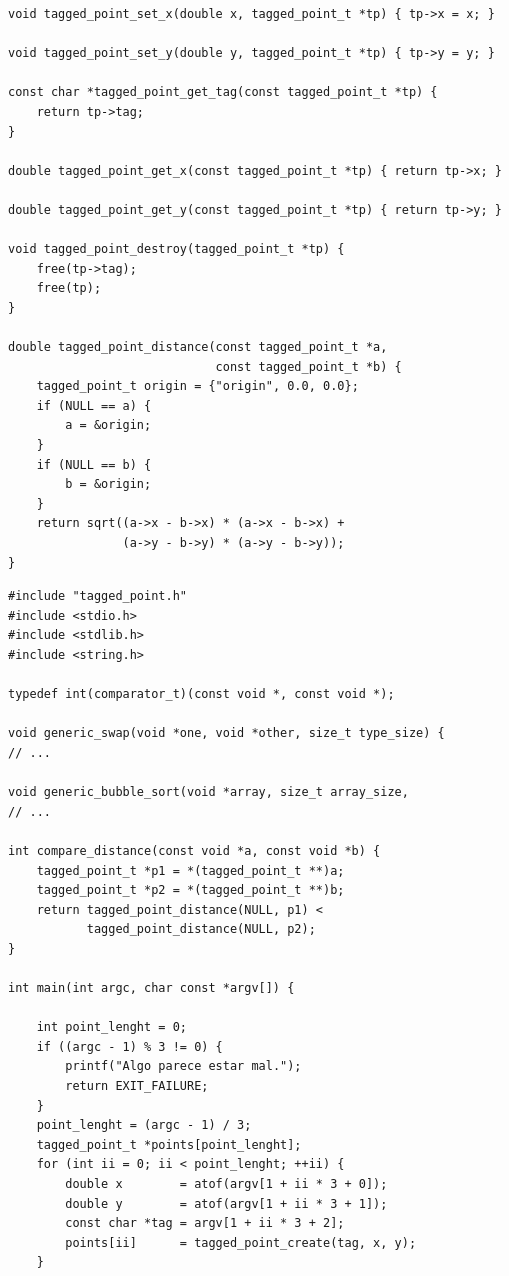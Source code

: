 \documentclass[a4paper]{article}
\begin{document}
\begin{exercises}
\begin{minipage}[H]{\linewidth}
\begin{lstlisting}[style=C,
caption={Solución al ejercicio 22 -- \texttt{tagged\_point.c}},
label={lst:solution22}]
void tagged_point_set_x(double x, tagged_point_t *tp) { tp->x = x; }

void tagged_point_set_y(double y, tagged_point_t *tp) { tp->y = y; }

const char *tagged_point_get_tag(const tagged_point_t *tp) {
    return tp->tag;
}

double tagged_point_get_x(const tagged_point_t *tp) { return tp->x; }

double tagged_point_get_y(const tagged_point_t *tp) { return tp->y; }

void tagged_point_destroy(tagged_point_t *tp) {
    free(tp->tag);
    free(tp);
}

double tagged_point_distance(const tagged_point_t *a,
                             const tagged_point_t *b) {
    tagged_point_t origin = {"origin", 0.0, 0.0};
    if (NULL == a) {
        a = &origin;
    }
    if (NULL == b) {
        b = &origin;
    }
    return sqrt((a->x - b->x) * (a->x - b->x) +
                (a->y - b->y) * (a->y - b->y));
}
\end{lstlisting}
\end{minipage}

\noindent
\begin{minipage}[H]{\linewidth}
\mbox{}
\begin{lstlisting}[style=C,
caption={Solución al ejercicio 22 -- \texttt{main.c}},
label={lst:solution22}]
#include "tagged_point.h"
#include <stdio.h>
#include <stdlib.h>
#include <string.h>

typedef int(comparator_t)(const void *, const void *);

void generic_swap(void *one, void *other, size_t type_size) {
// ...

void generic_bubble_sort(void *array, size_t array_size,
// ...

int compare_distance(const void *a, const void *b) {
    tagged_point_t *p1 = *(tagged_point_t **)a;
    tagged_point_t *p2 = *(tagged_point_t **)b;
    return tagged_point_distance(NULL, p1) <
           tagged_point_distance(NULL, p2);
}

int main(int argc, char const *argv[]) {

    int point_lenght = 0;
    if ((argc - 1) % 3 != 0) {
        printf("Algo parece estar mal.");
        return EXIT_FAILURE;
    }
    point_lenght = (argc - 1) / 3;
    tagged_point_t *points[point_lenght];
    for (int ii = 0; ii < point_lenght; ++ii) {
        double x        = atof(argv[1 + ii * 3 + 0]);
        double y        = atof(argv[1 + ii * 3 + 1]);
        const char *tag = argv[1 + ii * 3 + 2];
        points[ii]      = tagged_point_create(tag, x, y);
    }


\end{lstlisting}
\end{minipage}
\end{exercises}
\end{document}
